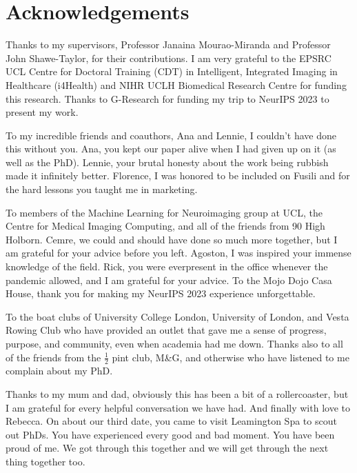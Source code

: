 \chapter*{Acknowledgements}

Thanks to my supervisors, Professor Janaina Mourao-Miranda and Professor John Shawe-Taylor, for their contributions. 
I am very grateful to the EPSRC UCL Centre for Doctoral Training (CDT) in Intelligent, Integrated Imaging in Healthcare (i4Health) and NIHR UCLH Biomedical
Research Centre for funding this research.
Thanks to G-Research for funding my trip to NeurIPS 2023 to present my work.

To my incredible friends and coauthors, Ana and Lennie, I couldn't have done this without you. Ana, you kept our paper alive when I had given up on it (as well as the PhD). Lennie, your brutal honesty about the work being rubbish made it infinitely better. Florence, I was honored to be included on Fusili and for the hard lessons you taught me in marketing.

To members of the Machine Learning for Neuroimaging group at UCL, the Centre for Medical Imaging Computing, and all of the friends from 90 High Holborn.
Cemre, we could and should have done so much more together, but I am grateful for your advice before you left. 
Agoston, I was inspired your immense knowledge of the field.
Rick, you were everpresent in the office whenever the pandemic allowed, and I am grateful for your advice.
To the Mojo Dojo Casa House, thank you for making my NeurIPS 2023 experience unforgettable.

To the boat clubs of University College London, University of London, and Vesta Rowing Club who have provided an outlet that gave me a sense of progress, purpose, and community, even when academia had me down. Thanks also to all of the friends from the $\frac{1}{2}$ pint club, M\&G, and otherwise who have listened to me complain about my PhD.

Thanks to my mum and dad, obviously this has been a bit of a rollercoaster, but I am grateful for every helpful conversation we have had. And finally with love to Rebecca. On about our third date, you came to visit Leamington Spa to scout out PhDs. You have experienced every good and bad moment. You have been proud of me. We got through this together and we will get through the next thing together too.

